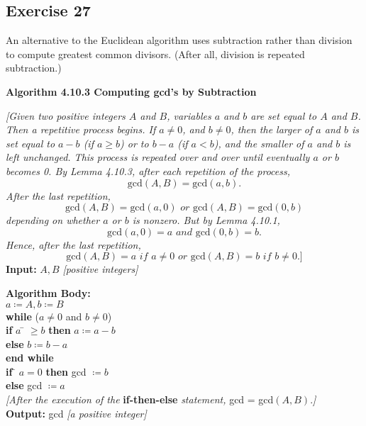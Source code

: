 \documentclass[14pt]{extarticle}
\newcommand{\cy}{\color{cyan}}
\begin{document}
\subsection{Exercise 27}
An alternative to the Euclidean algorithm uses subtraction rather than division to compute greatest common divisors. (After all, division is repeated subtraction.)

\begin{tcolorbox}[colframe=cyan]
    {\bf \cy Algorithm 4.10.3 Computing gcd’s by Subtraction}

    {\it [Given two positive integers $A$ and $B$, variables $a$ and $b$ are set equal to $A$ and $B$. Then a repetitive process begins. If $a \neq 0$, and $b \neq 0$, then the larger of $a$ and $b$ is set equal to $a - b$ (if $a \geq b$) or to $b - a$ (if $a < b$), and the smaller of $a$ and $b$ is left unchanged. This process is repeated over and over until eventually $a$ or $b$ becomes 0. By Lemma 4.10.3, after each repetition of the process,}
    \[
        \text{gcd}(A, B) = \text{gcd}(a, b).
    \]
    {\it After the last repetition,}
    \[
        \text{gcd}(A, B) = \text{gcd}(a, 0) \textit{ or } \text{gcd}(A, B) = \text{gcd}(0, b)
    \]
    {\it depending on whether $a$ or $b$ is nonzero. But by Lemma 4.10.1,}
    \[
        \text{gcd}(a, 0) = a \textit{ and } \text{gcd}(0, b) = b.
    \]
    {\it Hence, after the last repetition,}
    \[
        \text{gcd}(A,B) = a \textit{ if } a \neq 0 \textit{ or } \text{gcd}(A,B) = b \textit{ if } b \neq 0. \textit{]}
    \]
    {\bf Input:} $A, B$ {\it[positive integers]}
    \begin{tabbing}
        {\bf Alg}\={\bf orithm Body:} \\
        \> $a \coloneqq A, b \coloneqq B$ \\
        \> {\bf wh}\={\bf ile} ($a \neq 0$ and $b \neq 0$) \\
        \>          \> {\bf if} $a$ \= $\geq b$ {\bf then} $a \coloneqq a - b$ \\
        \>          \>             \> {\bf else} $b \coloneqq b - a$ \\
        \> {\bf end while} \\
        \> {\bf if} \= $a = 0$ {\bf then} gcd $\coloneqq b$ \\
        \>             \> {\bf else} gcd $\coloneqq a$ \\
        \> {\it [After the execution of the} {\bf if-then-else} {\it statement,} gcd = gcd$(A,B).${\it]} \\
        {\bf Output:} gcd {\it [a positive integer]}
    \end{tabbing}
\end{tcolorbox}
\end{document}
